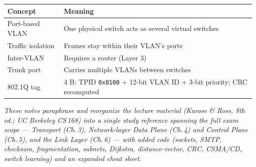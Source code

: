 \documentclass[hidelinks]{article}
\begin{document}
\noindent\begin{tabularx}{\textwidth}{|l|X|}
\hline
\textbf{Concept} & \textbf{Meaning} \\
\hline
Port-based VLAN & One physical switch acts as several virtual switches \\
\hline
Traffic isolation & Frames stay within their VLAN's ports \\
\hline
Inter-VLAN & Requires a router (Layer 3) \\
\hline
Trunk port & Carries multiple VLANs between switches \\
\hline
802.1Q tag & 4 B: TPID \texttt{0x8100} + 12-bit VLAN ID + 3-bit priority; CRC recomputed \\
\hline
\end{tabularx}

\vfill
\noindent\textit{\color{Thistle}These notes paraphrase and reorganize the
lecture material (Kurose \& Ross, 8th ed.; UC Berkeley CS\,168) into a single
study reference spanning the full exam scope --- Transport (Ch.\,3),
Network-layer Data Plane (Ch.\,4) and Control Plane (Ch.\,5), and the Link
Layer (Ch.\,6) --- with added code (sockets, SMTP, checksum, fragmentation,
subnets, Dijkstra, distance-vector, CRC, CSMA/CD, switch learning) and an
expanded cheat sheet.}
\end{document}
